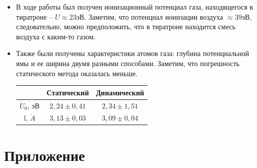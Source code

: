 \documentclass[a4paper,12pt]{article}
\begin{document}
\begin{itemize}
\item В ходе работы был получен ионизационный потенциал газа, находящегося в тиратроне -- $U \approx 23 эВ$. Заметим, что потенциал ионизации воздуха $\approx 39 эВ$, следовательно, можно предположить, что в тиратроне находится смесь воздуха с каким-то газом.

\item Также были получены характеристики атомов газа: глубина потенциальной ямы и ее ширина двумя разными способами. Заметим, что погрешность статического метода оказалась меньше.

\begin{table}[h]
\centering
\begin{tabular}{|c|c|c|}
\hline
 & Статический & Динамический \\ \hline
$U_0$, эВ & $2,24 \pm 0,41$ & $2,34 \pm 1,51$ \\ \hline
l, $\mathring{A}$ & $3,13 \pm 0,03$ & $3,09 \pm 0,04$ \\ \hline
\end{tabular}
\end{table}
\end{itemize}
\newpage

\section*{Приложение}
\end{document}
